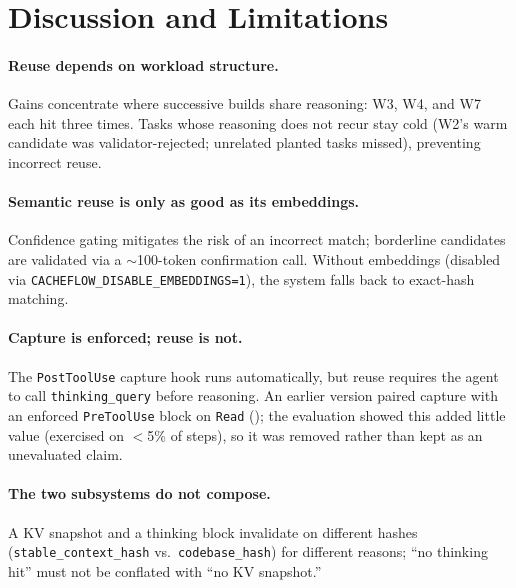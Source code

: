 \documentclass[10pt]{article}
\begin{document}
\section{Discussion and Limitations}
\label{sec:discussion}

\paragraph{Reuse depends on workload structure.} Gains concentrate where successive
builds share reasoning: W3, W4, and W7 each hit three times. Tasks whose
reasoning does not recur stay cold (W2's warm candidate was validator-rejected;
unrelated planted tasks missed), preventing incorrect reuse.

\paragraph{Semantic reuse is only as good as its embeddings.} Confidence gating
mitigates the risk of an incorrect match; borderline candidates are validated
via a $\sim$\num{100}-token confirmation call. Without embeddings (disabled via
\texttt{CACHEFLOW\_DISABLE\_EMBEDDINGS=1}), the system falls back to exact-hash
matching.

\paragraph{Capture is enforced; reuse is not.} The \texttt{PostToolUse} capture
hook runs automatically, but reuse requires the agent to call
\texttt{thinking\_query} before reasoning. An earlier version paired capture
with an enforced \texttt{PreToolUse} block on \texttt{Read} ();
the evaluation showed this added little value (exercised on $<$5\% of steps), so
it was removed rather than kept as an unevaluated claim.

\paragraph{The two subsystems do not compose.} A KV snapshot and a thinking
block invalidate on different hashes (\texttt{stable\_context\_hash} vs.\
\texttt{codebase\_hash}) for different reasons; ``no
thinking hit'' must not be conflated with ``no KV snapshot.''
\end{document}
